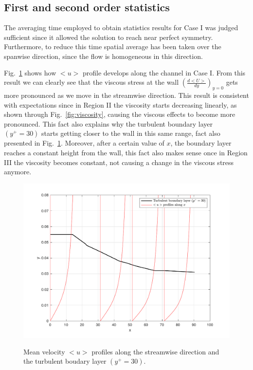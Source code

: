 \documentclass[twocolumn,10pt]{asme2e}
\begin{document}
\subsection*{First and second order statistics}

The averaging time employed to obtain statistics results for Case I was judged sufficient since it allowed the solution to reach near perfect symmetry. Furthermore, to reduce this time spatial average has been taken over the spanwise direction, since the flow is homogeneous in this direction.

Fig.~\ref{fig:u_CI}  shows how \(<u>\) profile develops along the channel in Case I. From this result we can clearly see that the viscous stress at the wall \(\left(\frac{d<U>}{dy}\right)_{y=0}\) gets more pronounced as we move in the streamwise direction. This result is consistent with expectations since in Region II the viscosity starts decreasing linearly, as shown through Fig.~\ref{fig:viscosity}, causing the viscous effects to become more pronounced. This fact also explains why the turbulent boundary layer \((y^+=30)\) starts getting closer to the wall in this same range, fact also presented in Fig.~\ref{fig:u_CI}. Moreover, after a certain value of \(x\), the boundary layer reaches a constant height from the wall, this fact also makes sense once in Region III the viscosity becomes constant, not causing a change in the viscous stress anymore.

\begin{figure}[t]
\centering
\scalebox{0.5}
{\includegraphics{u_CI.pdf}}
\caption{Mean velocity \(<u>\) profiles along the streamwise direction and the turbulent boudary layer \((y^+=30)\).}
\label{fig:u_CI}
\end{figure}
\end{document}
